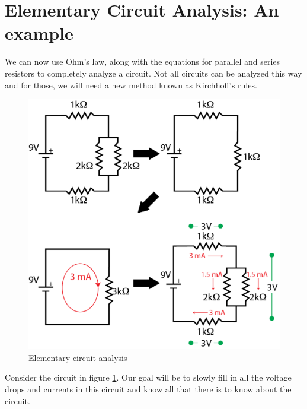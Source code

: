 \documentclass{tufte-book}
\begin{document}
\section{Elementary Circuit Analysis: An example}
\label{sec:circuitanalysis}
We can now use Ohm's law, along with the equations for parallel and series resistors to completely analyze a circuit. Not all circuits can be analyzed this way and for those, we will need a new method known as Kirchhoff's rules. 

\begin{figure}[h]
\caption{Elementary circuit analysis}
\label{fig:elemcirc}
\begin{center}
\includegraphics{elemcirc.png}
\end{center}
\end{figure}


Consider the circuit in figure \ref{fig:elemcirc}. Our goal will be to slowly fill in all the voltage drops and currents in this circuit and know all that there is to know about the circuit. 
\end{document}
